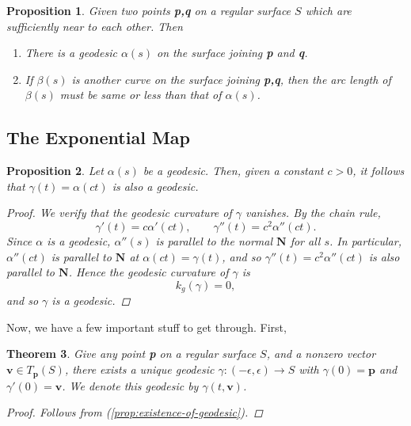 \documentclass[10pt, a4paper]{article}
\theoremstyle{plain}
\newtheorem{theorem}{Theorem}[section]
\newtheorem{proposition}[theorem]{Proposition}
\theoremstyle{definition}
\theoremstyle{remark}
\begin{document}
\begin{proposition}
    Given two points \textbf{p,q} on a regular surface $S$ which are sufficiently near to each other. Then

    \begin{enumerate}[label=(\roman*)]
        \item There is a geodesic $\alpha(s) $ on the surface joining \textbf{p} and \textbf{q}.
        \item If $\beta(s)$ is another curve on the surface joining \textbf{p,q}, then the arc length of $\beta(s)$ must be same or less than that of $\alpha(s)$.
    \end{enumerate}
\end{proposition}


\pagebreak
\subsection{The Exponential Map}

\begin{proposition}
Let $\alpha(s)$ be a geodesic. Then, given a constant $c >0$, it follows that $\gamma(t) =  \alpha(ct)$ is also a geodesic.

\begin{proof}
    We verify that the geodesic curvature of $\gamma$ vanishes. By the chain rule,
    \[
        \gamma'(t) = c\alpha'(ct), \qquad \gamma''(t) = c^2\alpha''(ct).
    \]
    Since $\alpha$ is a geodesic, $\alpha''(s)$ is parallel to the normal $\mathbf{N}$ 
    for all $s$. In particular, $\alpha''(ct)$ is parallel to $\mathbf{N}$ at 
    $\alpha(ct) = \gamma(t)$, and so $\gamma''(t) = c^2\alpha''(ct)$ is also parallel 
    to $\mathbf{N}$. Hence the geodesic curvature of $\gamma$ is
    \[
        k_g(\gamma) = 0,
    \]
    and so $\gamma$ is a geodesic.
\end{proof}

\end{proposition}

Now, we have a few important stuff to get through. First,

\begin{theorem}
    Give any point \textbf{p} on a regular surface $S$, and a nonzero vector $\textbf{v}\in T_\textbf{p}(S)$, there exists a \textit{unique} geodesic $\gamma :(- \epsilon, \epsilon) \to S$ with $\gamma(0) = \textbf{p}$ and $\gamma'(0) = \textbf{v}$. We denote this geodesic by $\gamma(t, \textbf{v})$. 

    \begin{proof}
        Follows from (\ref{prop:existence-of-geodesic}).
    \end{proof}
\end{theorem}
\end{document}
